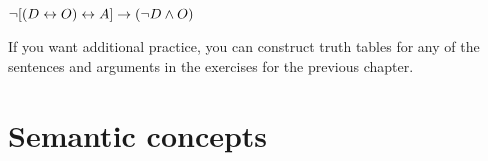 \begin{earg}
%	


\item	$\neg [(D \leftrightarrow O) \leftrightarrow A] \rightarrow (\neg D \wedge O) $

\end{earg}


If you want additional practice, you can construct truth tables for any of the sentences and arguments in the exercises for the previous chapter.


\chapter{Semantic concepts}
\label{s:SemanticConcepts}

